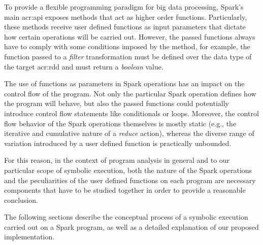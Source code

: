 \label{ch:symbolic-spark}

To provide a flexible programming paradigm for big data processing, Spark's main \acrshort{acr:api} exposes methods that act as higher order functions. Particularly, these methods receive user defined functions as input parameters that dictate how certain operations will be carried out. However, the passed functions always have to comply with some conditions imposed by the method, for example, the function passed to a \textit{filter} transformation must be defined over the data type of the target \acrshort{acr:rdd} and must return a \textit{boolean} value.

The use of functions as parameters in Spark operations has an impact on the control flow of the program. Not only the particular Spark operation defines how the program will behave, but also the passed functions could potentially introduce control flow statements like conditionals or loops. Moreover, the control flow behavior of the Spark operations themselves is mostly static (e.g., the iterative and cumulative nature of a \textit{reduce} action), whereas the diverse range of variation introduced by a user defined function is practically unbounded.

For this reason, in the context of program analysis in general and to our particular scope of symbolic execution, both the nature of the Spark operations and the peculiarities of the user defined functions on each program are necessary components that have to be studied together in order to provide a reasonable conclusion.

The following sections describe the conceptual process of a symbolic execution carried out on a Spark program, as well as a detailed explanation of our proposed implementation.




